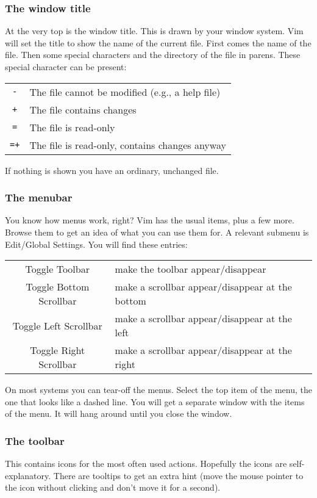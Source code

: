 \subsubsection{The window title}
At the very top is the window title.  This is drawn by your window system.
Vim will set the title to show the name of the current file.  First comes the
name of the file.  Then some special characters and the directory of the file
in parens.  These special character can be present:

\begin{center}\begin{longtable}{c l}
				\verb:-: & The file cannot be modified (e.g., a help file) \\
				\verb!+! & The file contains changes \\
				\verb!=! & The file is read-only \\
				\verb!=+! & The file is read-only, contains changes anyway \\
\end{longtable}\end{center}
If nothing is shown you have an ordinary, unchanged file.
\subsubsection{The menubar}
You know how menus work, right?  Vim has the usual items, plus a few more.
Browse them to get an idea of what you can use them for.
A relevant submenu is Edit/Global Settings.
You will find these entries:

\begin{center}\begin{longtable}{c l}
				Toggle Toolbar & make the toolbar appear/disappear \\
				Toggle Bottom Scrollbar & make a scrollbar appear/disappear at the bottom \\
				Toggle Left Scrollbar & make a scrollbar appear/disappear at the left \\
				Toggle Right Scrollbar & make a scrollbar appear/disappear at the right \\
\end{longtable}\end{center}

On most systems you can tear-off the menus.
Select the top item of the menu, the one that looks like a dashed line.
You will get a separate window with the items of the menu.
It will hang around until you close the window.

\subsubsection{The toolbar}
This contains icons for the most often used actions.
Hopefully the icons are self-explanatory.
There are tooltips to get an extra hint (move the mouse pointer to the icon without clicking and don't move it for a second).


